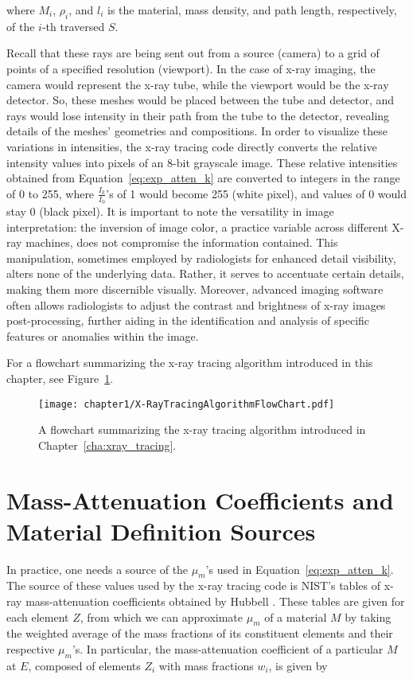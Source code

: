 \noindent where $M_i$, $\rho_i$, and $l_i$ is the material, mass density, and path length, respectively, of the $i$-th traversed $S$.

\par Recall that these rays are being sent out from a source (camera) to a grid of points of a specified resolution (viewport). In the case of x-ray imaging, the camera would represent the x-ray tube, while the viewport would be the x-ray detector. So, these meshes would be placed between the tube and detector, and rays would lose intensity in their path from the tube to the detector, revealing details of the meshes' geometries and compositions. In order to visualize these variations in intensities, the x-ray tracing code directly converts the relative intensity values into pixels of an 8-bit grayscale image. These relative intensities obtained from Equation~\ref{eq:exp_atten_k} are converted to integers in the range of 0 to 255, where $\frac{I_k}{I_0}$'s of 1 would become 255 (white pixel), and values of 0 would stay 0 (black pixel). It is important to note the versatility in image interpretation: the inversion of image color, a practice variable across different X-ray machines, does not compromise the information contained. This manipulation, sometimes employed by radiologists for enhanced detail visibility, alters none of the underlying data. Rather, it serves to accentuate certain details, making them more discernible visually. Moreover, advanced imaging software often allows radiologists to adjust the contrast and brightness of x-ray images post-processing, further aiding in the identification and analysis of specific features or anomalies within the image.


\par For a flowchart summarizing the x-ray tracing algorithm introduced in this chapter, see Figure~\ref{fig:xray_trace_flowchart}.

\begin{figure}[htb!]
  \centering
  \texttt{[image: chapter1/X-RayTracingAlgorithmFlowChart.pdf]}
  \caption{A flowchart summarizing the x-ray tracing algorithm introduced in Chapter~\ref{cha:xray_tracing}.}
  \label{fig:xray_trace_flowchart}
\end{figure}

\section{Mass-Attenuation Coefficients and Material Definition Sources}
In practice, one needs a source of the $\mu_m$'s used in Equation~\ref{eq:exp_atten_k}. The source of these values used by the x-ray tracing code is NIST's tables of x-ray mass-attenuation coefficients obtained by Hubbell \cite{hubbell1982photon}. These tables are given for each element $Z$, from which we can approximate $\mu_m$ of a material $M$ by taking the weighted average of the mass fractions of its constituent elements and their respective $\mu_m$'s. In particular, the mass-attenuation coefficient of a particular $M$ at $E$, composed of elements ${Z_i}$ with mass fractions ${w_i}$, is given by

